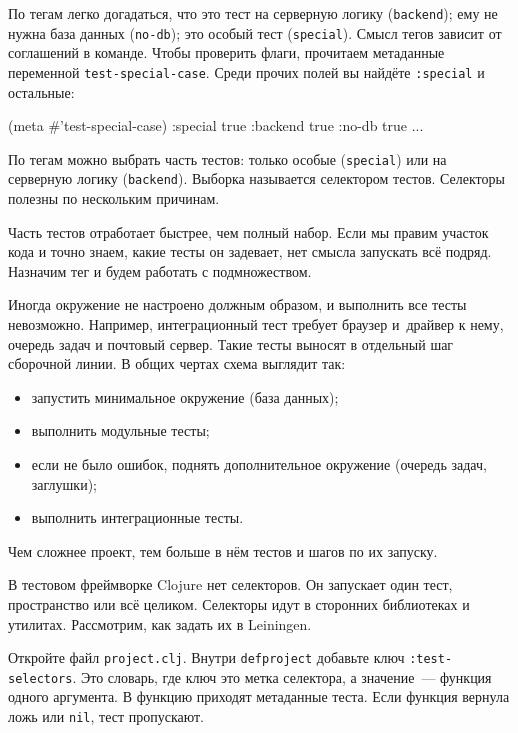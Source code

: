 По тегам легко догадаться, что это тест на серверную логику (\verb|backend|);
ему не нужна база данных (\verb|no-db|); это особый тест (\verb|special|). Смысл
тегов зависит от соглашений в команде. Чтобы проверить флаги, прочитаем
метаданные переменной \verb|test-special-case|. Среди прочих полей вы найдёте
\verb|:special| и остальные:

\begin{english}
  \begin{clojure}
(meta #'test-special-case)
{:special true :backend true :no-db true ...}
  \end{clojure}
\end{english}

По тегам можно выбрать часть тестов: только особые (\verb|special|) или на
серверную логику (\verb|backend|). Выборка называется селектором
тестов. Селекторы полезны по нескольким причинам.

Часть тестов отработает быстрее, чем полный набор. Если мы правим участок кода
и точно знаем, какие тесты он задевает, нет смысла запускать всё
подряд. Назначим тег и будем работать с подмножеством.

Иногда окружение не настроено должным образом, и выполнить все тесты
невозможно. Например, интеграционный тест требует браузер и~драйвер к нему,
очередь задач и почтовый сервер. Такие тесты выносят в отдельный шаг сборочной
линии. В общих чертах схема выглядит так:

\begin{itemize}

\item
  запустить минимальное окружение (база данных);

\item
  выполнить модульные тесты;

\item
  если не было ошибок, поднять дополнительное окружение (очередь задач,
  заглушки);

\item
  выполнить интеграционные тесты.

\end{itemize}

\noindent
Чем сложнее проект, тем больше в нём тестов и шагов по их запуску.

В тестовом фреймворке Clojure нет селекторов. Он запускает один тест,
пространство или всё целиком. Селекторы идут в сторонних библиотеках и
утилитах. Рассмотрим, как задать их в Leiningen.

Откройте файл \verb|project.clj|. Внутри \verb|defproject| добавьте ключ
\verb|:test-selectors|. Это словарь, где ключ это метка селектора, а
значение~--- функция одного аргумента. В функцию приходят метаданные теста. Если
функция вернула ложь или \verb|nil|, тест пропускают.

